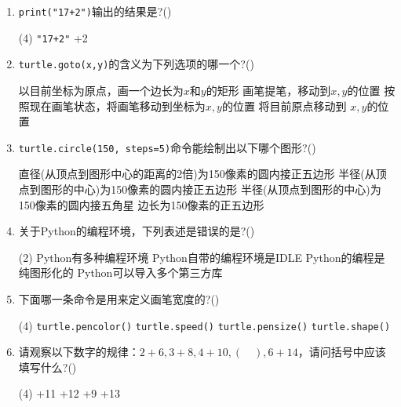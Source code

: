 \documentclass[11pt]{ctexart}
\begin{document}
\begin{enumerate}
        \item \lstinline!print("17+2")!输出的结果是?(\qquad)
        \begin{tasks}(4)
            \task \lstinline!"17+2"!
            +2
        \end{tasks}

        \newpage
        \item \lstinline!turtle.goto(x,y)!的含义为下列选项的哪一个?(\qquad)
        \begin{tasks}
            \task 以目前坐标为原点，画一个边长为$x$和$y$的矩形
            \task 画笔提笔，移动到$x,y$的位置
            \task 按照现在画笔状态，将画笔移动到坐标为$x,y$的位置
            \task 将目前原点移动到 $x,y$的位置 
        \end{tasks}

        \item \lstinline!turtle.circle(150, steps=5)!命令能绘制出以下哪个图形?(\qquad)
        \begin{tasks}
            \task 直径(从顶点到图形中心的距离的2倍)为150像素的圆内接正五边形
            \task 半径(从顶点到图形的中心)为150像素的圆内接正五边形
            \task 半径(从顶点到图形的中心)为150像素的圆内接五角星
            \task 边长为150像素的正五边形
        \end{tasks}

        \item 关于Python的编程环境，下列表述是错误的是?(\qquad)
        \begin{tasks}(2)
            \task Python有多种编程环境
            \task Python自带的编程环境是IDLE
            \task Python的编程是纯图形化的
            \task Python可以导入多个第三方库
        \end{tasks}

        \item 下面哪一条命令是用来定义画笔宽度的?(\qquad)
        \begin{tasks}(4)
            \task \lstinline!turtle.pencolor()!
            \task \lstinline!turtle.speed()!
            \task \lstinline!turtle.pensize()!
            \task \lstinline!turtle.shape()!
        \end{tasks}

        \item 请观察以下数字的规律：$2+6,3+8,4+10,(\quad),6+14$，请问括号中应该填写什么?(\qquad)
        \begin{tasks}(4)
            +11
            +12
            +9
            +13
        \end{tasks}


\end{enumerate}
\end{document}
